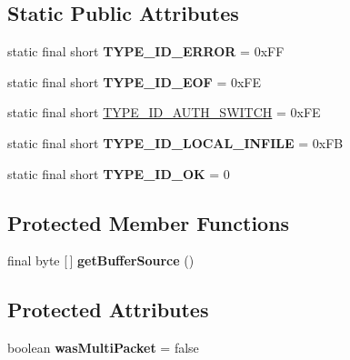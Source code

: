 \subsection*{Static Public Attributes}
\begin{DoxyCompactItemize}
\item 
\mbox{\label{classcom_1_1mysql_1_1jdbc_1_1_buffer_aaa8f7ceb780c783f736ddefdb0231677}} 
static final short {\bfseries T\+Y\+P\+E\+\_\+\+I\+D\+\_\+\+E\+R\+R\+OR} = 0x\+FF
\item 
\mbox{\label{classcom_1_1mysql_1_1jdbc_1_1_buffer_a0b7efeab25742beac2b8dfe29e7f9485}} 
static final short {\bfseries T\+Y\+P\+E\+\_\+\+I\+D\+\_\+\+E\+OF} = 0x\+FE
\item 
static final short \mbox{\hyperlink{classcom_1_1mysql_1_1jdbc_1_1_buffer_a56f21b391ad7591e2ea8fb3661b69ddf}{T\+Y\+P\+E\+\_\+\+I\+D\+\_\+\+A\+U\+T\+H\+\_\+\+S\+W\+I\+T\+CH}} = 0x\+FE
\item 
\mbox{\label{classcom_1_1mysql_1_1jdbc_1_1_buffer_a8f9618038dd3bb2847bcdbf7a36992f6}} 
static final short {\bfseries T\+Y\+P\+E\+\_\+\+I\+D\+\_\+\+L\+O\+C\+A\+L\+\_\+\+I\+N\+F\+I\+LE} = 0x\+FB
\item 
\mbox{\label{classcom_1_1mysql_1_1jdbc_1_1_buffer_a4e18b02d53dcd859a57ee1a0793ba655}} 
static final short {\bfseries T\+Y\+P\+E\+\_\+\+I\+D\+\_\+\+OK} = 0
\end{DoxyCompactItemize}
\subsection*{Protected Member Functions}
\begin{DoxyCompactItemize}
\item 
\mbox{\label{classcom_1_1mysql_1_1jdbc_1_1_buffer_ab969db3e2fcd36822f96294abf79154a}} 
final byte \mbox{[}$\,$\mbox{]} {\bfseries get\+Buffer\+Source} ()
\end{DoxyCompactItemize}
\subsection*{Protected Attributes}
\begin{DoxyCompactItemize}
\item 
\mbox{\label{classcom_1_1mysql_1_1jdbc_1_1_buffer_adb7b6ce3666634481713b9c7ef17f8d8}} 
boolean {\bfseries was\+Multi\+Packet} = false
\end{DoxyCompactItemize}


